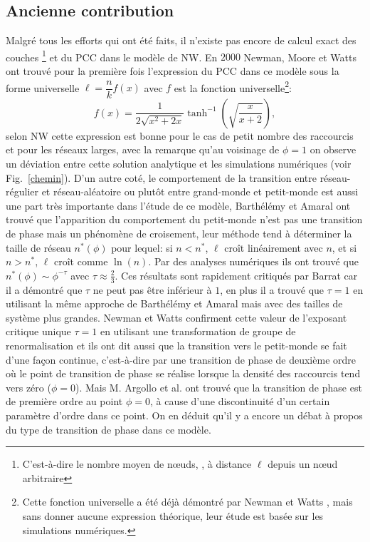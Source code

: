 \subsection{Ancienne contribution}
Malgré tous les  efforts qui ont été faits, il n'existe pas encore de calcul exact des couches \footnote{ C'est-à-dire le nombre moyen de nœuds, \nl, à distance $\ell$ depuis un nœud arbitraire} et du PCC dans le modèle de NW. En $2000$ Newman, Moore et Watts \cite{Newman-al2000} ont trouvé pour la première fois l'expression du PCC dans ce modèle sous la forme universelle $\ell=\dfrac{n}{k}f(x)$ avec $f$ est la fonction universelle\footnote{Cette fonction universelle a été déjà démontré par Newman et Watts \cite{Newman-Watts1999}, mais sans donner aucune expression théorique, leur étude est basée sur les simulations numériques.}:
\begin{equation}
f(x)=\frac{1}{2\sqrt{x^2+2x}}\tanh^{-1}(\sqrt{\frac{x}{x+2}}),\label{eq-ws}
\end{equation}
 selon NW cette expression est bonne pour le cas de petit nombre des raccourcis et pour les réseaux larges, avec la remarque qu'au voisinage de $\phi=1$ on observe un déviation entre 
 cette solution analytique et les simulations numériques (voir Fig.~\ref{chemin}). D'un autre coté, le comportement de la transition entre  réseau-régulier et  réseau-aléatoire ou plutôt entre  grand-monde et petit-monde est aussi une part très importante dans l'étude de ce modèle, Barthélémy et Amaral \cite{Barthelemy-Amaral1999} ont trouvé que l'apparition du comportement du petit-monde n'est pas une transition de phase mais un phénomène de croisement, leur méthode tend à déterminer la taille de réseau $n^*(\phi)$ pour lequel: si $n<n^*$, $\ell$ croît linéairement avec $n$, et si $n>n^*$, $\ell$ croît comme $\ln(n)$. Par des analyses numériques ils ont trouvé que $n^*(\phi)\sim\phi^{-\tau}$ avec 
$\tau\approx\frac{2}{3}$. Ces résultats sont rapidement critiqués par Barrat \cite{Barrat} car il a démontré que $\tau$ ne peut pas être inférieur à $1$, en plus il a trouvé que $\tau=1$ en utilisant la m\^{e}me approche de Barthélémy et Amaral mais avec
des tailles de système plus grandes. Newman et Watts \cite{Newman-Watts1999-2,Newman-Watts1999-3} confirment cette valeur de l'exposant critique unique $\tau=1$ en utilisant une transformation de groupe de renormalisation et ils ont dit aussi que la transition vers le petit-monde se fait d'une façon continue, c'est-à-dire par une transition de phase de deuxième ordre où le point de transition de phase se réalise lorsque la densité des raccourcis tend vers zéro ($\phi=0$). Mais M. Argollo et al. \cite{Argollo-al2000} ont trouvé que la transition de phase
est de première ordre au point $\phi=0$, à cause d'une discontinuité d'un certain paramètre d'ordre dans ce point. On en déduit qu'il y a  encore un débat à propos du type de transition de phase dans ce modèle.
